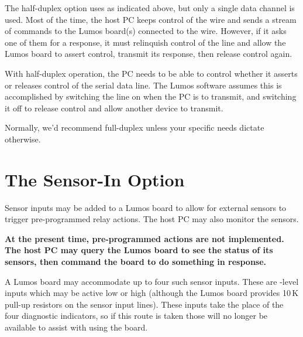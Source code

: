 \documentclass[letterpaper,twoside,onecolumn,openright,final]{memoir}
\begin{document}
The half-duplex option uses  as indicated above, but only a single data channel is used.  Most of the time,
the host PC keeps control of the wire and sends a stream of commands to the Lumos board(s) connected
to the wire.  However, if it asks one of them for a response, it must relinquish control of the line
and allow the Lumos board to assert control, transmit its response, then release control again.

With half-duplex operation, the PC needs to be able to control whether it asserts or releases control
of the serial data line.  The Lumos software assumes this is accomplished by switching the  
line on when the PC is to transmit, and switching it off to release control and allow another device to
transmit.

Normally, we'd recommend full-duplex unless your specific needs dictate otherwise.

\section{The Sensor-In Option}
Sensor inputs  may be added to a Lumos board to allow for external
sensors to trigger pre-programmed relay actions.  The host PC may also monitor the
sensors.

{\bfseries At the present time, pre-programmed actions are not implemented.  The host PC
may query the Lumos board to see the status of its sensors, then command the board to do
something in response.}

A Lumos board may accommodate up to four such sensor inputs.  These are -level inputs
which may be active low or high (although the Lumos board provides 10\,K pull-up resistors on the
sensor input lines).  These inputs take the place of the four diagnostic  indicators,
so if this route is taken those will no longer be available to assist with using the board.
\end{document}
